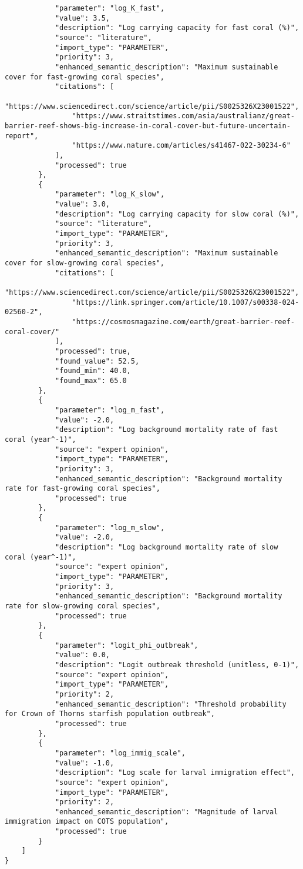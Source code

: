 \begin{lstlisting}
            "parameter": "log_K_fast",
            "value": 3.5,
            "description": "Log carrying capacity for fast coral (%)",
            "source": "literature",
            "import_type": "PARAMETER",
            "priority": 3,
            "enhanced_semantic_description": "Maximum sustainable cover for fast-growing coral species",
            "citations": [
                "https://www.sciencedirect.com/science/article/pii/S0025326X23001522",
                "https://www.straitstimes.com/asia/australianz/great-barrier-reef-shows-big-increase-in-coral-cover-but-future-uncertain-report",
                "https://www.nature.com/articles/s41467-022-30234-6"
            ],
            "processed": true
        },
        {
            "parameter": "log_K_slow",
            "value": 3.0,
            "description": "Log carrying capacity for slow coral (%)",
            "source": "literature",
            "import_type": "PARAMETER",
            "priority": 3,
            "enhanced_semantic_description": "Maximum sustainable cover for slow-growing coral species",
            "citations": [
                "https://www.sciencedirect.com/science/article/pii/S0025326X23001522",
                "https://link.springer.com/article/10.1007/s00338-024-02560-2",
                "https://cosmosmagazine.com/earth/great-barrier-reef-coral-cover/"
            ],
            "processed": true,
            "found_value": 52.5,
            "found_min": 40.0,
            "found_max": 65.0
        },
        {
            "parameter": "log_m_fast",
            "value": -2.0,
            "description": "Log background mortality rate of fast coral (year^-1)",
            "source": "expert opinion",
            "import_type": "PARAMETER",
            "priority": 3,
            "enhanced_semantic_description": "Background mortality rate for fast-growing coral species",
            "processed": true
        },
        {
            "parameter": "log_m_slow",
            "value": -2.0,
            "description": "Log background mortality rate of slow coral (year^-1)",
            "source": "expert opinion",
            "import_type": "PARAMETER",
            "priority": 3,
            "enhanced_semantic_description": "Background mortality rate for slow-growing coral species",
            "processed": true
        },
        {
            "parameter": "logit_phi_outbreak",
            "value": 0.0,
            "description": "Logit outbreak threshold (unitless, 0-1)",
            "source": "expert opinion",
            "import_type": "PARAMETER",
            "priority": 2,
            "enhanced_semantic_description": "Threshold probability for Crown of Thorns starfish population outbreak",
            "processed": true
        },
        {
            "parameter": "log_immig_scale",
            "value": -1.0,
            "description": "Log scale for larval immigration effect",
            "source": "expert opinion",
            "import_type": "PARAMETER",
            "priority": 2,
            "enhanced_semantic_description": "Magnitude of larval immigration impact on COTS population",
            "processed": true
        }
    ]
}
\end{lstlisting}
\clearpage
